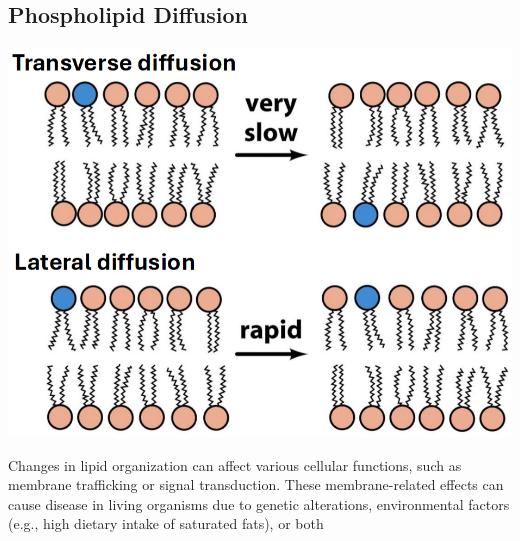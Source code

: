 \documentclass[10pt]{article}
\begin{document}
\subsection*{Phospholipid Diffusion}
\begin{center}
    \includegraphics*[scale=0.8]{L3_12.png}
\end{center}
Changes in lipid organization can affect various cellular functions, such as membrane trafficking or signal transduction.  These membrane-related effects can cause disease in living organisms due to genetic alterations, environmental factors (e.g., high dietary intake of saturated fats), or both
\end{document}
